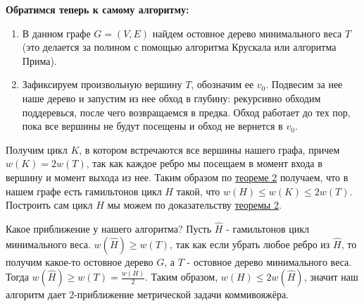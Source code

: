 \documentclass[14pt]{article}
\begin{document}
	\begin{center}
		\textbf{\large Обратимся теперь к самому алгоритму:}
	\end{center}

	\begin{enumerate}
		\item В данном графе $G=(V,E)$ найдем остовное дерево минимального веса $T$ (это делается за полином с помощью алгоритма Крускала или алгоритма Прима).
		\item Зафиксируем произвольную вершину $T$, обозначим ее $v_0$. Подвесим за нее наше дерево и запустим из нее обход в глубину: рекурсивно обходим поддеревься, после чего возвращаемся в предка. Обход работает до тех пор, пока все вершины не будут посещены и обход не вернется в $v_0$.
	\end{enumerate}
	
	Получим цикл $K$, в котором встречаются все вершины нашего графа, причем $w(K) = 2w(T)$, так как каждое ребро мы посещаем в момент входа в вершину и момент выхода из нее. Таким образом по \hyperref[Th2]{теореме 2} получаем, что в нашем графе есть гамильтонов цикл $H$ такой, что $w(H) \leq w(K) \leq 2w(T)$. Построить сам цикл $H$ мы можем по доказательству \hyperref[Th2]{теоремы 2}.
	
	Какое приближение у нашего алгоритма? Пусть $\hat{H}$ - гамильтонов цикл минимального веса. $w(\hat{H}) \geq w(T)$, так как если убрать любое ребро из $\hat{H}$, то получим какое-то остовное дерево $G$, а $T$ - остовное дерево минимального веса. Тогда $w(\hat{H}) \geq w(T) = \frac{w(H)}{2}$. Таким образом, $w(H) \leq 2w(\hat{H})$, значит наш алгоритм дает 2-приближение метрической задачи коммивояжёра.
	
\end{document}
